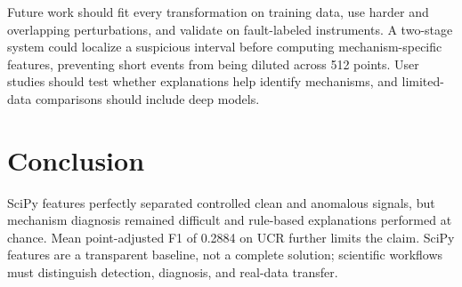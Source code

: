 Future work should fit every transformation on training data, use harder and overlapping perturbations, and validate on fault-labeled instruments. A two-stage system could localize a suspicious interval before computing mechanism-specific features, preventing short events from being diluted across 512 points. User studies should test whether explanations help identify mechanisms, and limited-data comparisons should include deep models.

\section{Conclusion}

SciPy features perfectly separated controlled clean and anomalous signals, but mechanism diagnosis remained difficult and rule-based explanations performed at chance. Mean point-adjusted F1 of 0.2884 on UCR further limits the claim. SciPy features are a transparent baseline, not a complete solution; scientific workflows must distinguish detection, diagnosis, and real-data transfer.
